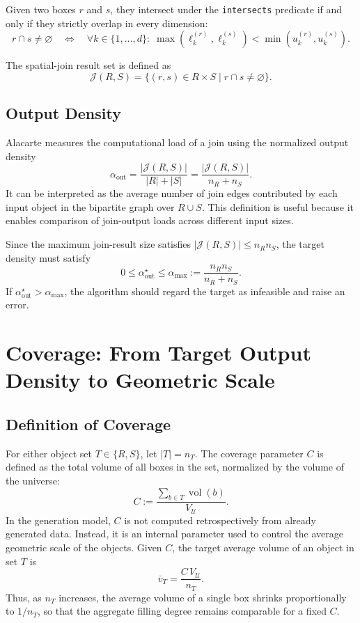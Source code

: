 \documentclass[11pt,a4paper]{article}
\newcommand{\Uset}{\mathcal{U}}
\newcommand{\Jset}{\mathcal{J}}
\newcommand{\vol}{\operatorname{vol}}
\newcommand{\code}[1]{\texttt{#1}}
\begin{document}
Given two boxes $r$ and $s$, they intersect under the \code{intersects} predicate if and only if they strictly overlap in every dimension:
\[
  r\cap s\ne\varnothing
  \quad\Longleftrightarrow\quad
  \forall k\in\{1,\dots,d\}:\;
  \max(\ell^{(r)}_k,\ell^{(s)}_k)<
  \min(u^{(r)}_k,u^{(s)}_k).
\]

The spatial-join result set is defined as
\[
  \Jset(R,S)=\{(r,s)\in R\times S\mid r\cap s\ne\varnothing\}.
\]

\subsection{Output Density}

Alacarte measures the computational load of a join using the normalized output density
\[
  \alpha_{\mathrm{out}}
  =\frac{|\Jset(R,S)|}{|R|+|S|}
  =\frac{|\Jset(R,S)|}{n_R+n_S}.
\]
It can be interpreted as the average number of join edges contributed by each input object in the bipartite graph over $R\cup S$. This definition is useful because it enables comparison of join-output loads across different input sizes.

Since the maximum join-result size satisfies $|\Jset(R,S)|\le n_Rn_S$, the target density must satisfy
\[
  0\le \alpha_{\mathrm{out}}^\star
  \le
  \alpha_{\max}
  :=\frac{n_Rn_S}{n_R+n_S}.
\]
If $\alpha_{\mathrm{out}}^\star>\alpha_{\max}$, the algorithm should regard the target as infeasible and raise an error.

\section{Coverage: From Target Output Density to Geometric Scale}

\subsection{Definition of Coverage}

For either object set $T\in\{R,S\}$, let $|T|=n_T$. The coverage parameter $C$ is defined as the total volume of all boxes in the set, normalized by the volume of the universe:
\[
  C
  :=
  \frac{\sum_{b\in T}\vol(b)}{V_{\Uset}}.
\]
In the generation model, $C$ is not computed retrospectively from already generated data. Instead, it is an internal parameter used to control the average geometric scale of the objects. Given $C$, the target average volume of an object in set $T$ is
\[
  \bar v_T
  =\frac{C\,V_{\Uset}}{n_T}.
\]
Thus, as $n_T$ increases, the average volume of a single box shrinks proportionally to $1/n_T$, so that the aggregate filling degree remains comparable for a fixed $C$.
\end{document}
